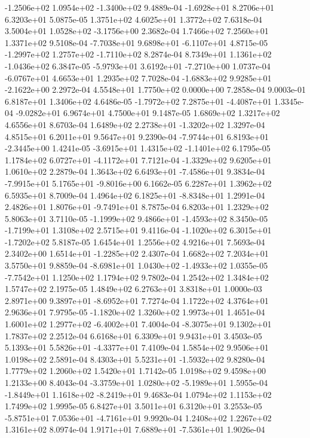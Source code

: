 -1.2506e+02  1.0954e+02 -1.3400e+02  9.4889e-04
-1.6928e+01  8.2706e+01  6.3203e+01  5.0875e-05
1.3751e+02 4.6025e+01 1.3772e+02  7.6318e-04
 3.5004e+01  1.0528e+02 -3.1756e+00  2.3682e-04
1.7466e+02 7.2560e+01 1.3371e+02  9.5108e-04
-7.7038e+01  9.6898e+01 -6.1107e+01  4.8715e-05
-1.2997e+02  1.2757e+02 -1.7110e+02  8.2874e-04
 8.7349e+01  1.1361e+02 -1.0436e+02  6.3847e-05
-5.9793e+01  3.6192e+01 -7.2710e+00  1.0737e-04
-6.0767e+01  4.6653e+01  1.2935e+02  7.7028e-04
-1.6883e+02  9.9285e+01 -2.1622e+00  2.2972e-04
4.5548e+01 1.7750e+02 0.0000e+00  7.2858e-04
9.0003e-01 6.8187e+01 1.3406e+02  4.6486e-05
-1.7972e+02  7.2875e+01 -4.4087e+01  1.3345e-04
-9.0282e+01  6.9674e+01  4.7500e+01  9.1487e-05
1.6869e+02 1.3217e+02 4.6556e+01  8.6703e-04
 1.6489e+02  2.2738e+01 -1.3202e+02  1.3297e-04
4.8515e+01 6.2011e+01 9.5647e+01  9.2390e-04
-7.9744e+01  6.8193e+01 -2.3445e+00  1.4241e-05
-3.6915e+01  1.4315e+02 -1.1401e+02  6.1795e-05
 1.1784e+02  6.0727e+01 -4.1172e+01  7.7121e-04
-1.3329e+02  9.6205e+01  1.0610e+02  2.2879e-04
 1.3643e+02  6.6493e+01 -7.4586e+01  9.3834e-04
-7.9915e+01  5.1765e+01 -9.8016e+00  6.1662e-05
6.2287e+01 1.3962e+02 6.5935e+01  8.7009e-04
 1.4964e+02  6.1825e+01 -8.8348e+01  1.2991e-04
 2.4826e+01  1.8076e+01 -9.7491e+01  8.7875e-04
6.8203e+01 1.2329e+02 5.8063e+01  3.7110e-05
-1.1999e+02  9.4866e+01 -1.4593e+02  8.3450e-05
-1.7199e+01  1.3108e+02  2.5715e+01  9.4116e-04
-1.1020e+02  6.3015e+01 -1.7202e+02  5.8187e-05
1.6454e+01 1.2556e+02 4.9216e+01  7.5693e-04
 2.3402e+00  1.6514e+01 -1.2285e+02  2.4307e-04
1.6682e+02 7.2034e+01 3.5750e+01  9.8859e-04
-8.6981e+01  1.0430e+02 -1.4933e+02  1.0355e-05
-7.7542e+01  1.1250e+02  1.1794e+02  9.7802e-04
1.2542e+02 1.3484e+02 1.5747e+02  2.1975e-05
1.4849e+02 6.2763e+01 3.8318e+01  1.0000e-03
 2.8971e+00  9.3897e+01 -8.6952e+01  7.7274e-04
1.1722e+02 4.3764e+01 2.9636e+01  7.9795e-05
-1.1820e+02  1.3260e+02  1.9973e+01  1.4651e-04
 1.6001e+02  1.2977e+02 -6.4002e+01  7.4004e-04
-8.3075e+01  9.1302e+01  1.7837e+02  2.2512e-04
6.6168e+01 6.3309e+01 9.9431e+01  3.4503e-05
 5.1393e+01  5.5826e+01 -4.3377e+01  7.4109e-04
1.5854e+02 9.9506e+01 1.0198e+02  2.5891e-04
 8.4303e+01  5.5231e+01 -1.5932e+02  9.8280e-04
1.7779e+02 1.2060e+02 1.5420e+01  1.7142e-05
1.0198e+02 9.4598e+00 1.2133e+00  8.4043e-04
-3.3759e+01  1.0280e+02 -5.1989e+01  1.5955e-04
-1.8449e+01  1.1618e+02 -8.2419e+01  9.4683e-04
1.0794e+02 1.1153e+02 1.7499e+02  1.9995e-05
6.8427e+01 3.5011e+01 6.3120e+01  3.2553e-05
-5.8751e+01  7.0536e+01 -4.7161e+01  9.9920e-04
1.2408e+02 1.2267e+02 1.3161e+02  8.0974e-04
 1.9171e+01  7.6889e+01 -7.5361e+01  1.9026e-04
